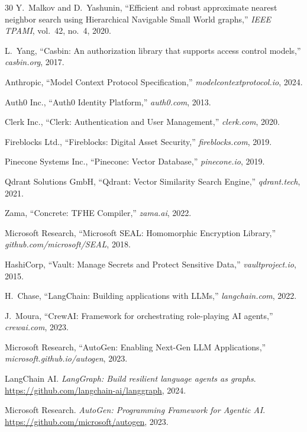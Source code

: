 \begin{thebibliography}{30}
Y.~Malkov and D.~Yashunin, ``Efficient and robust approximate nearest neighbor search using Hierarchical Navigable Small World graphs,'' \textit{IEEE TPAMI}, vol.~42, no.~4, 2020.

L.~Yang, ``Casbin: An authorization library that supports access control models,'' \textit{casbin.org}, 2017.

Anthropic, ``Model Context Protocol Specification,'' \textit{modelcontextprotocol.io}, 2024.

Auth0 Inc., ``Auth0 Identity Platform,'' \textit{auth0.com}, 2013.

Clerk Inc., ``Clerk: Authentication and User Management,'' \textit{clerk.com}, 2020.

Fireblocks Ltd., ``Fireblocks: Digital Asset Security,'' \textit{fireblocks.com}, 2019.

Pinecone Systems Inc., ``Pinecone: Vector Database,'' \textit{pinecone.io}, 2019.

Qdrant Solutions GmbH, ``Qdrant: Vector Similarity Search Engine,'' \textit{qdrant.tech}, 2021.

Zama, ``Concrete: TFHE Compiler,'' \textit{zama.ai}, 2022.

Microsoft Research, ``Microsoft SEAL: Homomorphic Encryption Library,'' \textit{github.com/microsoft/SEAL}, 2018.

HashiCorp, ``Vault: Manage Secrets and Protect Sensitive Data,'' \textit{vaultproject.io}, 2015.

H.~Chase, ``LangChain: Building applications with LLMs,'' \textit{langchain.com}, 2022.

J.~Moura, ``CrewAI: Framework for orchestrating role-playing AI agents,'' \textit{crewai.com}, 2023.

Microsoft Research, ``AutoGen: Enabling Next-Gen LLM Applications,'' \textit{microsoft.github.io/autogen}, 2023.


LangChain AI. \textit{LangGraph: Build resilient language agents as graphs}. \url{https://github.com/langchain-ai/langgraph}, 2024.

Microsoft Research. \textit{AutoGen: Programming Framework for Agentic AI}. \url{https://github.com/microsoft/autogen}, 2023.


\end{thebibliography}
